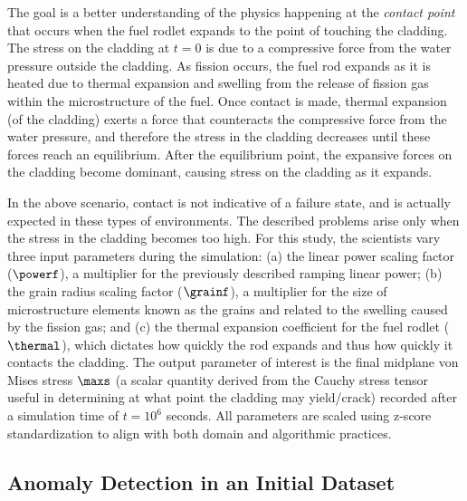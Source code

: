 The goal is a better understanding of the physics happening at the \emph{contact point} that occurs when the fuel rodlet expands to the point of touching the cladding.
%
The stress on the cladding at $t=0$ is due to a compressive force from the water pressure outside the cladding.
%
As fission occurs, the fuel rod expands as it is heated due to thermal expansion and swelling from the release of fission gas within the microstructure of the fuel.
%
Once contact is made, thermal expansion (of the cladding) exerts a force that counteracts the compressive force from the water pressure, and therefore the stress in the cladding decreases until these forces reach an equilibrium.
%
After the equilibrium point, the expansive forces on the cladding become dominant, causing stress on the cladding as it expands.

In the above scenario, contact is not indicative of a failure state, and is actually expected in these types of environments.
%
The described problems arise only when the stress in the cladding becomes too high.
%
For this study, the scientists vary three input parameters during the simulation: (a) the linear power scaling factor ($\powerf$), a multiplier for the previously described ramping linear power; (b) the grain radius scaling factor ($\grainf$), a multiplier for the size of microstructure elements known as the grains and related to the swelling caused by the fission gas; and (c) the thermal expansion coefficient for the fuel rodlet ($\thermal$), which dictates how quickly the rod expands and thus how quickly it contacts the cladding.
%
The output parameter of interest is the final midplane von Mises stress $\maxs$ (a scalar quantity derived from the Cauchy stress tensor useful in determining at what point the cladding may yield/crack) recorded after a simulation time of $t=10^6$ seconds.
%
All parameters are scaled using z-score standardization to align with both domain and algorithmic practices.

\subsection{Anomaly Detection in an Initial Dataset}
\label{sec:anomaly}

